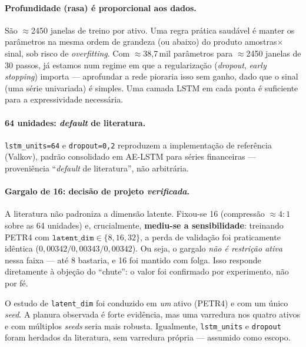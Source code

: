 \paragraph{Profundidade (rasa) é proporcional aos dados.}
São $\approx$2450 janelas de treino por ativo. Uma regra prática saudável é
manter os parâmetros na mesma ordem de grandeza (ou abaixo) do produto
amostras$\times$sinal, sob risco de \emph{overfitting}. Com $\approx$38,7\,mil
parâmetros para $\approx$2450 janelas de 30 passos, já estamos num regime em que
a regularização (\emph{dropout}, \emph{early stopping}) importa --- aprofundar a
rede pioraria isso sem ganho, dado que o sinal (uma série univariada) é simples.
Uma camada LSTM em cada ponta é suficiente para a expressividade necessária.

\paragraph{64 unidades: \emph{default} de literatura.}
\texttt{lstm\_units=64} e \texttt{dropout=0,2} reproduzem a implementação de
referência (Valkov), padrão consolidado em AE-LSTM para séries financeiras ---
proveniência ``\emph{default} de literatura'', não arbitrária.

\paragraph{Gargalo de 16: decisão de projeto \emph{verificada}.}
A literatura não padroniza a dimensão latente. Fixou-se 16 (compressão
$\approx 4{:}1$ sobre as 64 unidades) e, crucialmente, \textbf{mediu-se a
sensibilidade}: treinando PETR4 com $\texttt{latent\_dim}\in\{8,16,32\}$, a perda
de validação foi praticamente idêntica ($0{,}00342 / 0{,}00343 / 0{,}00342$).
Ou seja, o gargalo \emph{não é restrição ativa} nessa faixa --- até 8 bastaria,
e 16 foi mantido com folga. Isso responde diretamente à objeção do ``chute'': o
valor foi confirmado por experimento, não por fé.

\begin{honesto}
O estudo de \texttt{latent\_dim} foi conduzido em \emph{um} ativo (PETR4) e com
um único \emph{seed}. A planura observada é forte evidência, mas uma varredura
nos quatro ativos e com múltiplos \emph{seeds} seria mais robusta. Igualmente,
\texttt{lstm\_units} e \texttt{dropout} foram herdados da literatura, sem
varredura própria --- assumido como escopo.
\end{honesto}
